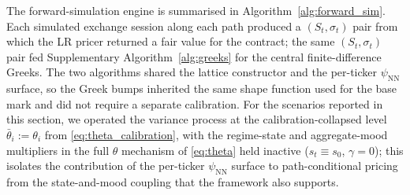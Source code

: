 The forward-simulation engine is summarised in Algorithm~\ref{alg:forward_sim}. Each simulated exchange session along each path produced a $(S_t, \sigma_t)$ pair from which the LR pricer returned a fair value for the contract; the same $(S_t, \sigma_t)$ pair fed Supplementary Algorithm~\ref{alg:greeks} for the central finite-difference Greeks. The two algorithms shared the lattice constructor and the per-ticker $\psi_{\mathrm{NN}}$ surface, so the Greek bumps inherited the same shape function used for the base mark and did not require a separate calibration. For the scenarios reported in this section, we operated the variance process at the calibration-collapsed level $\bar\theta_i := \theta_i$ from \eqref{eq:theta_calibration}, with the regime-state and aggregate-mood multipliers in the full $\theta$ mechanism of \eqref{eq:theta} held inactive ($s_t \equiv s_0$, $\gamma = 0$); this isolates the contribution of the per-ticker $\psi_{\mathrm{NN}}$ surface to path-conditional pricing from the state-and-mood coupling that the framework also supports.


